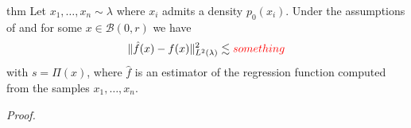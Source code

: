 \documentclass[11pt]{article}
\begin{document}
\begin{restatable}{thm}{} 
    Let $x_1, \dots, x_n \sim \lambda$ where $x_i$ admits a density $p_0(x_i)$. Under the assumptions of  and for some $x\in \mathcal{B}(0, r)$ we have
    \[\|\hat{f}(x) - f(x)\|_{L^2(\lambda)}^2 \lesssim \textcolor{red}{something} \]
    with $s = \Pi(x)$, where $\hat{f}$ is an estimator of the regression function computed from the samples $x_1, \dots, x_n$.
\end{restatable}
\noindent \textit{Proof.} 

\end{document}

